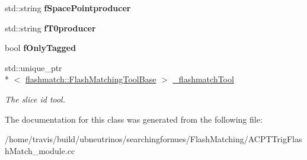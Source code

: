 \begin{DoxyCompactItemize}
\item 
\hypertarget{classACPTTrigFlashMatch_a37a8ef70c53d0d0e2dd4df71b92ed967}{std\-::string {\bfseries f\-Space\-Pointproducer}}\label{classACPTTrigFlashMatch_a37a8ef70c53d0d0e2dd4df71b92ed967}

\item 
\hypertarget{classACPTTrigFlashMatch_a5c9298a02f961ee72ce941670365c7e7}{std\-::string {\bfseries f\-T0producer}}\label{classACPTTrigFlashMatch_a5c9298a02f961ee72ce941670365c7e7}

\item 
\hypertarget{classACPTTrigFlashMatch_ab870ea0c1f870ff9c2077e466188951e}{bool {\bfseries f\-Only\-Tagged}}\label{classACPTTrigFlashMatch_ab870ea0c1f870ff9c2077e466188951e}

\item 
\hypertarget{classACPTTrigFlashMatch_a12e3a8369411bc0e4608ec08d2cb56c5}{std\-::unique\-\_\-ptr\\*
$<$ \hyperlink{classflashmatch_1_1FlashMatchingToolBase}{flashmatch\-::\-Flash\-Matching\-Tool\-Base} $>$ \hyperlink{classACPTTrigFlashMatch_a12e3a8369411bc0e4608ec08d2cb56c5}{\-\_\-flashmatch\-Tool}}\label{classACPTTrigFlashMatch_a12e3a8369411bc0e4608ec08d2cb56c5}

\begin{DoxyCompactList}\small\item\em The slice id tool. \end{DoxyCompactList}\end{DoxyCompactItemize}


The documentation for this class was generated from the following file\-:\begin{DoxyCompactItemize}
\item 
/home/travis/build/ubneutrinos/searchingfornues/\-Flash\-Matching/A\-C\-P\-T\-Trig\-Flash\-Match\-\_\-module.\-cc\end{DoxyCompactItemize}
